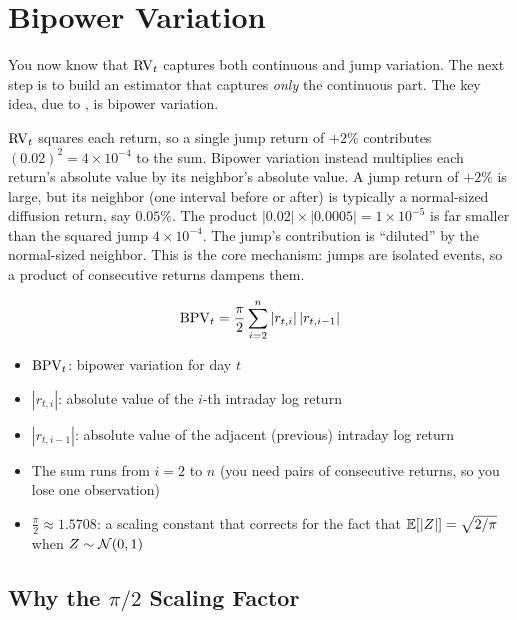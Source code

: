 \section{Bipower Variation}
\label{sec:bpv}

You now know that $\operatorname{RV}_t$ captures both continuous and jump variation.
The next step is to build an estimator that captures \emph{only} the continuous part.
The key idea, due to \citet{BNS2004}, is bipower variation.

\begin{intuition}
$\operatorname{RV}_t$ squares each return, so a single jump return of $+2\%$ contributes $(0.02)^2 = 4 \times 10^{-4}$ to the sum.
Bipower variation instead multiplies each return's absolute value by its neighbor's absolute value.
A jump return of $+2\%$ is large, but its neighbor (one interval before or after) is typically a normal-sized diffusion return, say $0.05\%$.
The product $|0.02| \times |0.0005| = 1 \times 10^{-5}$ is far smaller than the squared jump $4 \times 10^{-4}$.
The jump's contribution is ``diluted'' by the normal-sized neighbor.
This is the core mechanism: jumps are isolated events, so a product of consecutive returns dampens them.
\end{intuition}

\begin{definition}
\begin{equation}
  \operatorname{BPV}_t = \frac{\pi}{2}\sum_{i=2}^{n}|r_{t,i}|\,|r_{t,i-1}|
  \label{eq:bpv}
\end{equation}
\begin{itemize}[nosep]
  \item $\operatorname{BPV}_t$: bipower variation for day $t$
  \item $|r_{t,i}|$: absolute value of the $i$-th intraday log return
  \item $|r_{t,i-1}|$: absolute value of the adjacent (previous) intraday log return
  \item The sum runs from $i=2$ to $n$ (you need pairs of consecutive returns, so you lose one observation)
  \item $\frac{\pi}{2} \approx 1.5708$: a scaling constant that corrects for the fact that $\mathbb{E}[|Z|] = \sqrt{2/\pi}$ when $Z \sim \mathcal{N}(0,1)$
\end{itemize}
\end{definition}

\subsection{Why the $\pi/2$ Scaling Factor}

